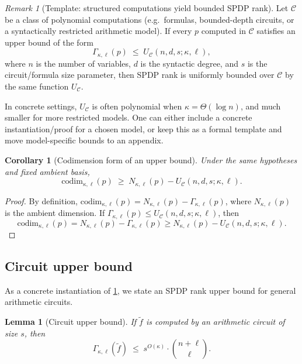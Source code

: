 \documentclass[12pt]{article}
\newtheorem{lemma}[theorem]{Lemma}
\newtheorem{corollary}[theorem]{Corollary}
\theoremstyle{definition}
\theoremstyle{remark}
\newtheorem{remark}[theorem]{Remark}
\newcommand{\codim}{\mathrm{codim}}
\newcommand{\rankSPDP}{\Gamma}
\begin{document}
\begin{remark}[Template: structured computations yield bounded SPDP rank]
\label{rem:template-structured-bounded-rank}
Let $\mathcal{C}$ be a class of polynomial computations (e.g.\ formulas,
bounded-depth circuits, or a syntactically restricted arithmetic model).
If every $p$ computed in $\mathcal{C}$ satisfies an upper bound of the form
\[
\Gamma_{\kappa,\ell}(p) \;\le\; U_{\mathcal{C}}(n,d,s;\kappa,\ell),
\]
where $n$ is the number of variables, $d$ is the syntactic degree, and $s$ is the
circuit/formula size parameter, then SPDP rank is uniformly bounded over $\mathcal{C}$
by the same function $U_{\mathcal{C}}$.

In concrete settings, $U_{\mathcal{C}}$ is often polynomial when $\kappa=\Theta(\log n)$,
and much smaller for more restricted models. One can either include a concrete
instantiation/proof for a chosen model, or keep this as a formal template and move
model-specific bounds to an appendix.
\end{remark}

\begin{corollary}[Codimension form of an upper bound]
\label{cor:codim-template}
Under the same hypotheses and fixed ambient basis,
\[
  \codim_{\kappa,\ell}(p) \;\ge\; N_{\kappa,\ell}(p) - U_{\mathcal{C}}(n,d,s;\kappa,\ell).
\]
\end{corollary}

\begin{proof}
By definition, $\codim_{\kappa,\ell}(p) = N_{\kappa,\ell}(p) - \Gamma_{\kappa,\ell}(p)$, where $N_{\kappa,\ell}(p)$
is the ambient dimension. If $\Gamma_{\kappa,\ell}(p) \le U_{\mathcal{C}}(n,d,s;\kappa,\ell)$, then
\[
\codim_{\kappa,\ell}(p) = N_{\kappa,\ell}(p) - \Gamma_{\kappa,\ell}(p) \ge N_{\kappa,\ell}(p) - U_{\mathcal{C}}(n,d,s;\kappa,\ell).
\]
\end{proof}

\subsection{Circuit upper bound}
\label{subsec:circuit-upper-bound}

As a concrete instantiation of \ref{rem:template-structured-bounded-rank},
we state an SPDP rank upper bound for general arithmetic circuits.

\begin{lemma}[Circuit upper bound]
\label{lem:circuit-ub}
If $\tilde f$ is computed by an arithmetic circuit of size $s$, then
\[
  \rankSPDP_{\kappa,\ell}(\tilde f) \;\le\; s^{O(\kappa)} \cdot \binom{n + \ell}{\ell}.
\]
\end{lemma}
\end{document}
